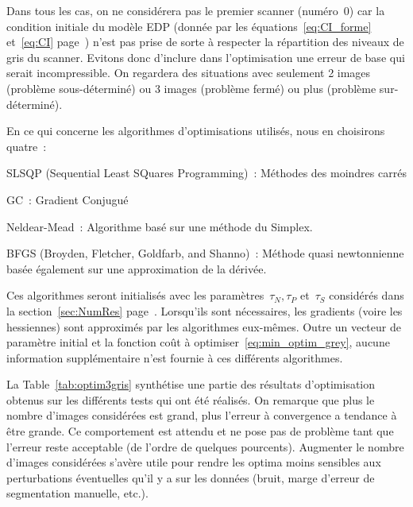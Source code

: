 \documentclass[main.tex]{subfiles}
\begin{document}
Dans tous les cas, on ne considérera pas le premier scanner (numéro~0) car la condition initiale du modèle EDP (donnée par les équations~\eqref{eq:CI_forme} et~\eqref{eq:CI} page~\pageref{eq:CI_forme}) n'est pas prise de sorte à respecter la répartition des niveaux de gris du scanner. Evitons donc d'inclure dans l'optimisation une erreur de base qui serait incompressible. On regardera des situations avec seulement 2 images (problème sous-déterminé) ou 3 images (problème fermé) ou plus (problème sur-déterminé).

En ce qui concerne les algorithmes d'optimisations utilisés, nous en choisirons quatre~:
\begin{myitemize}
\item SLSQP (Sequential Least SQuares Programming)~: Méthodes des moindres carrés 
\item GC~: Gradient Conjugué
\item Neldear-Mead~: Algorithme basé sur une méthode du Simplex.
\item BFGS (Broyden, Fletcher, Goldfarb, and Shanno)~: Méthode quasi newtonnienne basée  également sur une approximation de la dérivée.
\end{myitemize}
Ces algorithmes seront initialisés avec les paramètres~$\tau_N, \tau_P$ et~$\tau_S$ considérés dans la section~\ref{sec:NumRes} page~\pageref{sec:NumRes}. Lorsqu'ils sont nécessaires, les gradients (voire les hessiennes) sont approximés par les algorithmes eux-mêmes. Outre un vecteur de paramètre initial et la fonction coût à optimiser~\eqref{eq:min_optim_grey}, aucune information supplémentaire n'est fournie à ces différents algorithmes.


La Table~\ref{tab:optim3gris} synthétise une partie des résultats d'optimisation obtenus sur les différents tests qui ont été réalisés. 
On remarque que plus le nombre d'images considérées est grand, plus l'erreur à convergence a tendance à être grande. Ce comportement est attendu et ne pose pas de problème tant que l'erreur reste acceptable (de l'ordre de quelques pourcents). Augmenter le nombre d'images considérées s'avère utile pour rendre les optima moins sensibles aux perturbations éventuelles qu'il y a sur les données (bruit, marge d'erreur de segmentation manuelle, etc.).
\end{document}
